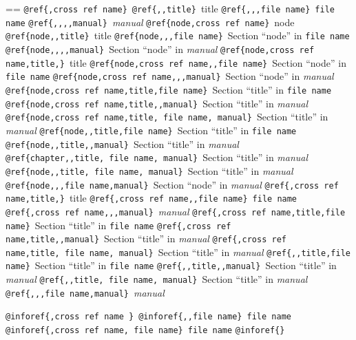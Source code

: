 \documentclass{book}
\makeatletter
\newenvironment{Texinfopreformatted}{%
  \par\GNUTobeylines\obeyspaces\frenchspacing\parskip=\z@\parindent=\z@}{}
{\catcode`\^^M=13 \gdef\GNUTobeylines{\catcode`\^^M=13 \def^^M{\null\par}}}
\newenvironment{Texinfoindented}{\begin{list}{}{}\item\relax}{\end{list}}
\renewcommand{\_}{\Texinfounderscore\discretionary{}{}{}}
\makeatother
\begin{document}
\begin{Texinfoindented}
\begin{Texinfopreformatted}
\texttt{@ref\{,cross ref name\}}\ 
\texttt{@ref\{{,}{,}title\}}\ title
\texttt{@ref\{{,}{,},file name\}}\ \texttt{file name}
\texttt{@ref\{{,}{,}{,}{,}manual\}}\ \textsl{manual}
\texttt{@ref\{node,cross ref name\}}\ node
\texttt{@ref\{node{,}{,}title\}}\ title
\texttt{@ref\{node{,}{,},file name\}}\ Section ``node'' in \texttt{file name}
\texttt{@ref\{node{,}{,}{,}{,}manual\}}\ Section ``node'' in \textsl{manual}
\texttt{@ref\{node,cross ref name,title,\}}\ title
\texttt{@ref\{node,cross ref name{,}{,}file name\}}\ Section ``node'' in \texttt{file name}
\texttt{@ref\{node,cross ref name{,}{,},manual\}}\ Section ``node'' in \textsl{manual}
\texttt{@ref\{node,cross ref name,title,file name\}}\ Section ``title'' in \texttt{file name}
\texttt{@ref\{node,cross ref name,title{,}{,}manual\}}\ Section ``title'' in \textsl{manual}
\texttt{@ref\{node,cross ref name,title,\ file name,\ manual\}}\ Section ``title'' in \textsl{manual}
\texttt{@ref\{node{,}{,}title,file name\}}\ Section ``title'' in \texttt{file name}
\texttt{@ref\{node{,}{,}title{,}{,}manual\}}\ Section ``title'' in \textsl{manual}
\texttt{@ref\{chapter{,}{,}title,\ file name,\ manual\}}\ Section ``title'' in \textsl{manual}
\texttt{@ref\{node{,}{,}title,\ file name,\ manual\}}\ Section ``title'' in \textsl{manual}
\texttt{@ref\{node{,}{,},file name,manual\}}\ Section ``node'' in \textsl{manual}
\texttt{@ref\{,cross ref name,title,\}}\ title
\texttt{@ref\{,cross ref name{,}{,}file name\}}\ \texttt{file name}
\texttt{@ref\{,cross ref name{,}{,},manual\}}\ \textsl{manual}
\texttt{@ref\{,cross ref name,title,file name\}}\ Section ``title'' in \texttt{file name}
\texttt{@ref\{,cross ref name,title{,}{,}manual\}}\ Section ``title'' in \textsl{manual}
\texttt{@ref\{,cross ref name,title,\ file name,\ manual\}}\ Section ``title'' in \textsl{manual}
\texttt{@ref\{{,}{,}title,file name\}}\ Section ``title'' in \texttt{file name}
\texttt{@ref\{{,}{,}title{,}{,}manual\}}\ Section ``title'' in \textsl{manual}
\texttt{@ref\{{,}{,}title,\ file name,\ manual\}}\ Section ``title'' in \textsl{manual}
\texttt{@ref\{{,}{,},file name,manual\}}\ \textsl{manual}

\texttt{@inforef\{,cross ref name \}}\ 
\texttt{@inforef\{{,}{,}file name\}}\ \texttt{file name}
\texttt{@inforef\{,cross ref name,\ file name\}}\ \texttt{file name}
\texttt{@inforef\{\}}\ 


\end{Texinfopreformatted}
\end{Texinfoindented}

%
%
%
%
%
%
%
\index[fn]{.@\texttt{.}}%
\index[fn]{?@\texttt{?}}%
%
\end{document}
